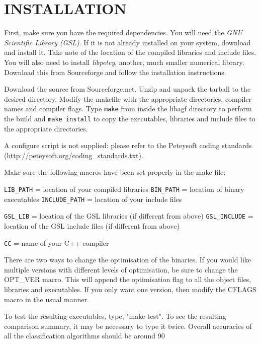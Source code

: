 \documentclass[12pt]{article}
\begin{document}
\section{INSTALLATION}

  First, make sure you have the required dependencies.  You will need the {\it GNU Scientific Library (GSL)}.  If it is not already installed on your system, download and install it.  Take note of the location of the compiled libraries and include files.  You will also need to install {\it libpetey}, another, much smaller numerical library.  Download this from Sourceforge and follow the installation instructions.

  Download the source from Sourceforge.net.  Unzip and unpack the tarball to the desired directory.  Modify the makefile with the appropriate directories, compiler names and compiler flags.  Type \verb"make" from inside the libagf directory to perform the build and \verb"make install" to copy the executables, libraries and include files to the appropriate directories.

  A configure script is not supplied: please refer to the Peteysoft coding standards (http://peteysoft.org/coding_standards.txt).

  Make sure the following macros have been set properly in the make file:

\verb/LIB_PATH/ = location of your compiled libraries\newline
\verb/BIN_PATH/ = location of binary executables\newline
\verb/INCLUDE_PATH/ = location of your include files

\verb/GSL_LIB/ = location of the GSL libraries (if different from above)\newline
\verb/GSL_INCLUDE/ = location of the GSL include files (if different from above)

\verb/CC/ = name of your C++ compiler

  There are two ways to change the optimisation of the binaries.  If you would like multiple versions with different levels of optimisation, be sure to change the OPT_VER macro.  This will append the optimisation flag to all the object files, libraries and executables.  If you only want one version, then modify the CFLAGS macro in the usual manner.

  To test the resulting executables, type, "make test".  To see the resulting comparison summary, it may be necessary to type it twice.  Overall accuracies of all the classification algorithms should be around 90 %
\end{document}
